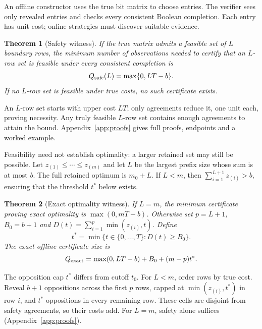 \documentclass[11pt]{article}
\newtheorem{theorem}{Theorem}
\begin{document}
An offline constructor uses the true bit matrix to choose entries. The verifier sees only revealed entries and checks every consistent Boolean completion. Each entry has unit cost; online strategies must discover suitable evidence.

\begin{theorem}[Safety witness]
\label{thm:safe}
If the true matrix admits a feasible set of $L$ boundary rows, the minimum number of observations needed to certify that an $L$-row set is feasible under every consistent completion is
\[
 Q_{\rm safe}(L)=\max\{0,LT-b\}.
\]
If no $L$-row set is feasible under true costs, no such certificate exists.
\end{theorem}
An $L$-row set starts with upper cost $LT$; only agreements reduce it, one unit each, proving necessity. Any truly feasible $L$-row set contains enough agreements to attain the bound. Appendix~\ref{app:proofs} gives full proofs, endpoints and a worked example.

Feasibility need not establish optimality: a larger retained set may still be possible. Let $z_{(1)}\le\cdots\le z_{(m)}$ and let $L$ be the largest prefix size whose sum is at most $b$. The full retained optimum is $m_0+L$. If $L<m$, then $\sum_{i=1}^{L+1}z_{(i)}>b$, ensuring that the threshold $t^*$ below exists.
\begin{theorem}[Exact optimality witness]
\label{thm:exact}
If $L=m$, the minimum certificate proving exact optimality is $\max(0,mT-b)$. Otherwise set $p=L+1$, $B_0=b+1$ and $D(t)=\sum_{i=1}^{p}\min(z_{(i)},t)$. Define
\begin{equation}
 t^*=\min\{t\in\{0,\ldots,T\}:D(t)\ge B_0\}.
 \label{eq:level}
\end{equation}
The exact offline certificate size is
\begin{equation}
 Q_{\rm exact}=\max(0,LT-b)+B_0+(m-p)t^*.
 \label{eq:exact}
\end{equation}
\end{theorem}
The opposition cap $t^*$ differs from cutoff $t_0$. For $L<m$, order rows by true cost. Reveal $b+1$ oppositions across the first $p$ rows, capped at $\min(z_{(i)},t^*)$ in row $i$, and $t^*$ oppositions in every remaining row. These cells are disjoint from safety agreements, so their costs add. For $L=m$, safety alone suffices (Appendix~\ref{app:proofs}).
\end{document}
